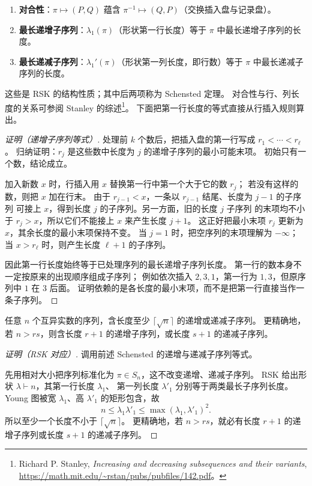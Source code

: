 \begin{proposition}
\label{prop:rsk-properties}
\begin{enumerate}[label=(\roman*),leftmargin=3em]
\item \textbf{对合性}：$\pi\mapsto(P,Q)$ 蕴含 $\pi^{-1}\mapsto(Q,P)$（交换插入盘与记录盘）。
\item \textbf{最长递增子序列}：$\lambda_1(\pi)$（形状第一行长度）等于 $\pi$ 中最长递增子序列的长度。
\item \textbf{最长递减子序列}：$\lambda_1'(\pi)$（形状第一列长度，即行数）等于 $\pi$ 中最长递减子序列的长度。
\end{enumerate}
这些是 RSK 的结构性质；其中后两项称为 Schensted 定理。
对合性与行、列长度的关系可参阅 Stanley 的综述\footnote{Richard P. Stanley,
\emph{Increasing and decreasing subsequences and their variants},
\url{https://math.mit.edu/~rstan/pubs/pubfiles/142.pdf}。}。
下面把第一行长度的等式直接从行插入规则算出。
\end{proposition}

\begin{proof}[证明（递增子序列等式）]
处理前 $k$ 个数后，把插入盘的第一行写成 $r_1<\cdots<r_\ell$。
归纳证明：$r_j$ 是这些数中长度为 $j$ 的递增子序列的最小可能末项。
初始只有一个数，结论成立。

加入新数 $x$ 时，行插入用 $x$ 替换第一行中第一个大于它的数 $r_j$；
若没有这样的数，则把 $x$ 加在行末。
由于 $r_{j-1}<x$，一条以 $r_{j-1}$ 结尾、长度为 $j-1$ 的子序列
可接上 $x$，得到长度 $j$ 的子序列。另一方面，旧的长度 $j$ 子序列
的末项均不小于 $r_j>x$，所以它们不能接上 $x$ 来产生长度 $j+1$。
这正好把最小末项 $r_j$ 更新为 $x$，其余长度的最小末项保持不变。
当 $j=1$ 时，把空序列的末项理解为 $-\infty$；
当 $x>r_\ell$ 时，则产生长度 $\ell+1$ 的子序列。

因此第一行长度始终等于已处理序列的最长递增子序列长度。
第一行的数本身不一定按原来的出现顺序组成子序列；
例如依次插入 $2,3,1$，第一行为 $1,3$，但原序列中 $1$ 在 $3$ 后面。
证明依赖的是各长度的最小末项，而不是把第一行直接当作一条子序列。
\end{proof}

\begin{theorem}
任意 $n$ 个互异实数的序列，含长度至少 $\lceil\sqrt n\rceil$ 的递增或递减子序列。
更精确地，若 $n>rs$，则含长度 $r+1$ 的递增子序列，或长度 $s+1$ 的递减子序列。
\end{theorem}

\begin{proof}[证明（RSK 对应）]
调用前述 Schensted 的递增与递减子序列等式。

先用相对大小把序列标准化为 $\pi\in S_n$，这不改变递增、递减子序列。
RSK 给出形状 $\lambda\vdash n$，其第一行长度 $\lambda_1$、
第一列长度 $\lambda'_1$ 分别等于两类最长子序列长度。
Young 图被宽 $\lambda_1$、高 $\lambda'_1$ 的矩形包含，故
\[
n\le\lambda_1\lambda'_1
\le\max(\lambda_1,\lambda'_1)^2.
\]
所以至少一个长度不小于 $\lceil\sqrt n\rceil$。
更精确地，若 $n>rs$，就必有长度 $r+1$ 的递增子序列或长度 $s+1$ 的递减子序列。
\end{proof}

